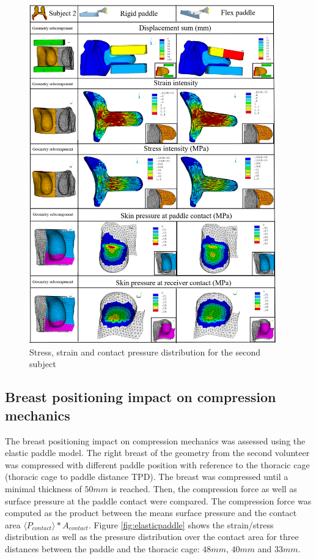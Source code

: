 \begin{figure}[!h]
\centering
\includegraphics[width=0.95\textwidth,keepaspectratio]{figures/subject2_compressionResults.png} 
\caption{Stress, strain and contact pressure distribution for the second subject}\label{fig:subject2_compressionResults}
\end{figure}

\clearpage
\subsection{Breast positioning impact on compression mechanics}

The breast positioning impact on compression mechanics was assessed using the elastic paddle model. The right breast of the geometry from the second volunteer was compressed with different paddle position with reference to the thoracic cage (thoracic cage to paddle distance TPD). The breast was compressed until a minimal thickness of $50mm$ is reached. Then, the compression force as well as surface pressure at the paddle contact were compared. The compression force was computed as the product between the means surface pressure and the contact area $\langle P_{contact}\rangle \ast  A_{contact}$.
Figure \ref{fig:elasticpaddle} shows the strain/stress distribution as well as the pressure distribution over the contact area for three distances between the paddle and the thoracic cage: $48mm$, $40mm$ and $33mm$. 
 
